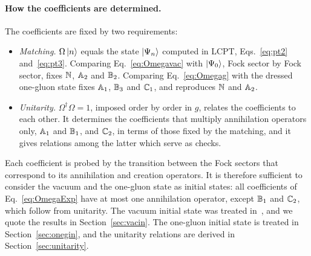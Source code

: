 \paragraph{How the coefficients are determined.} The coefficients are fixed by two requirements:
\begin{itemize}
\item \emph{Matching.} $\Omega\ket n$ equals the state $\ket{\Psi_n}$ computed in LCPT, Eqs.~\eqref{eq:pt2} and~\eqref{eq:pt3}. Comparing Eq.~\eqref{eq:Omegavac} with $\ket{\Psi_0}$, Fock sector by Fock sector, fixes $\mathbb{N}$, $\mathbb{A}_2$ and $\mathbb{B}_2$. Comparing Eq.~\eqref{eq:Omegag} with the dressed one-gluon state fixes $\mathbb{A}_1$, $\mathbb{B}_3$ and $\mathbb{C}_1$, and reproduces $\mathbb{N}$ and $\mathbb{A}_2$.
\item \emph{Unitarity.} $\Omega^\dagger\Omega=1$, imposed order by order in $g$, relates the coefficients to each other. It determines the coefficients that multiply annihilation operators only, $\mathbb{A}_1$ and $\mathbb{B}_1$, and $\mathbb{C}_2$, in terms of those fixed by the matching, and it gives relations among the latter which serve as checks.
\end{itemize}
Each coefficient is probed by the transition between the Fock sectors that correspond to its annihilation and creation operators. It is therefore sufficient to consider the vacuum and the one-gluon state as initial states: all coefficients of Eq.~\eqref{eq:OmegaExp} have at most one annihilation operator, except $\mathbb{B}_1$ and $\mathbb{C}_2$, which follow from unitarity. The vacuum initial state was treated in~\cite{Lublinsky:2016meo}, and we quote the results in Section~\ref{sec:vacin}. The one-gluon initial state is treated in Section~\ref{sec:onegin}, and the unitarity relations are derived in Section~\ref{sec:unitarity}.
